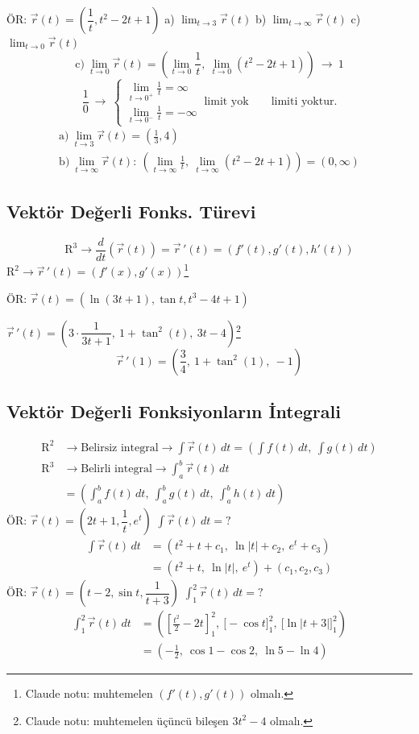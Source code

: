 \documentclass[11pt,a4paper]{article}
\begin{document}
ÖR: $\vec r(t)=\left(\dfrac1t,t^2-2t+1\right)$ \quad a) $\displaystyle\lim_{t\to3}\vec r(t)$ \quad b) $\displaystyle\lim_{t\to\infty}\vec r(t)$ \quad c) $\displaystyle\lim_{t\to0}\vec r(t)$
\[ \text{c)}\ \lim_{t\to0}\vec r(t)=\left(\lim_{t\to0}\frac1t,\ \lim_{t\to0}(t^2-2t+1)\right)\ \to\ 1 \]
\[ \frac10\ \to\ \begin{cases}\displaystyle\lim_{t\to0^+}\frac1t=\infty\\[2mm] \displaystyle\lim_{t\to0^-}\frac1t=-\infty\end{cases}\ \text{limit yok}\qquad \text{limiti yoktur.} \]
\begin{gather*}
\text{a)}\ \lim_{t\to3}\vec r(t)=\left(\frac13,4\right)\\
\text{b)}\ \lim_{t\to\infty}\vec r(t):\ \left(\lim_{t\to\infty}\frac1t,\ \lim_{t\to\infty}(t^2-2t+1)\right)=(0,\infty)
\end{gather*}

\subsection{Vektör Değerli Fonks. Türevi}
\[ \mathrm{R}^3\to\frac{d}{dt}\left(\vec r(t)\right)=\vec r\,'(t)=(f'(t),g'(t),h'(t)) \]
$\mathrm{R}^2\to\vec r\,'(t)=(f'(x),g'(x))$\footnote{Claude notu: muhtemelen $(f'(t),g'(t))$ olmalı.}

ÖR: $\vec r(t)=(\ln(3t+1),\tan t,t^3-4t+1)$

$\vec r\,'(t)=\left(3\cdot\dfrac{1}{3t+1},\ 1+\tan^2(t),\ 3t-4\right)$\footnote{Claude notu: muhtemelen üçüncü bileşen $3t^2-4$ olmalı.}
\[ \vec r\,'(1)=\left(\frac34,\ 1+\tan^2(1),\ -1\right) \]

\subsection{Vektör Değerli Fonksiyonların İntegrali}
\begin{align*}
\mathrm{R}^2&\to\text{Belirsiz integral}\to\int\vec r(t)\,dt=\left(\int f(t)\,dt,\ \int g(t)\,dt\right)\\
\mathrm{R}^3&\to\text{Belirli integral}\to\int_a^b\vec r(t)\,dt\\
&=\left(\int_a^b f(t)\,dt,\ \int_a^b g(t)\,dt,\ \int_a^b h(t)\,dt\right)
\end{align*}
ÖR: $\vec r(t)=\left(2t+1,\dfrac1t,e^t\right)$ \quad $\displaystyle\int\vec r(t)\,dt=?$
\begin{align*}
\int\vec r(t)\,dt&=\left(t^2+t+c_1,\ \ln|t|+c_2,\ e^t+c_3\right)\\
&=\left(t^2+t,\ \ln|t|,\ e^t\right)+(c_1,c_2,c_3)
\end{align*}
ÖR: $\vec r(t)=\left(t-2,\sin t,\dfrac{1}{t+3}\right)$ \quad $\displaystyle\int_1^2\vec r(t)\,dt=?$
\begin{align*}
\int_1^2\vec r(t)\,dt&=\left(\left[\frac{t^2}{2}-2t\right]_1^2,\ \Big[-\cos t\Big]_1^2,\ \Big[\ln|t+3|\Big]_1^2\right)\\
&=\left(-\frac12,\ \cos1-\cos2,\ \ln5-\ln4\right)
\end{align*}
\end{document}

